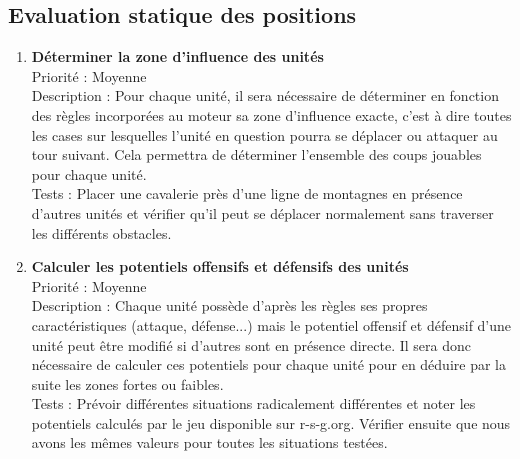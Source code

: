 \documentclass[12pt]{article}
\begin{document}
		\subsection{Evaluation statique des positions}

			\begin{enumerate}

				\item \textbf{Déterminer la zone d'influence des unités} 
				\\[0.7\baselineskip]
				Priorité : Moyenne 
				\\[0.7\baselineskip]
				Description : Pour chaque unité, il sera nécessaire de déterminer en fonction des règles incorporées au moteur sa zone d'influence exacte, 
				c'est à dire toutes les cases sur lesquelles l'unité en question pourra se déplacer ou attaquer au tour suivant. Cela permettra de déterminer 
				l'ensemble des coups jouables pour chaque unité. 
				\\[0.7\baselineskip]
				Tests : Placer une cavalerie près d'une ligne de montagnes en présence d'autres unités et vérifier qu'il peut se déplacer normalement sans traverser 
				les différents obstacles. 
				\\[0.7\baselineskip]

				\item \textbf{Calculer les potentiels offensifs et défensifs des unités} 
				\\[0.7\baselineskip]
				Priorité : Moyenne 
				\\[0.7\baselineskip]
				Description : Chaque unité possède d'après les règles ses propres caractéristiques (attaque, défense...) mais le potentiel offensif et défensif 
				d'une unité peut être modifié si d'autres sont en présence directe. Il sera donc nécessaire de calculer ces potentiels pour chaque unité pour en déduire 
				par la suite les zones fortes ou faibles. 
				\\[0.7\baselineskip]
				Tests : Prévoir différentes situations radicalement différentes et noter les potentiels calculés par le jeu disponible sur r-s-g.org. Vérifier ensuite 
				que nous avons les mêmes valeurs pour toutes les situations testées. 
				\\[0.7\baselineskip]


\end{enumerate}
\end{document}
